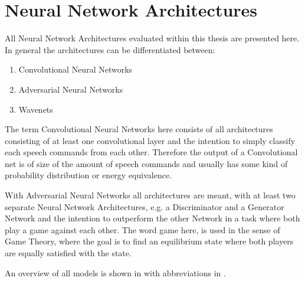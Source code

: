 
\section{Neural Network Architectures}\label{sec:nn_arch}
All Neural Network Architectures evaluated within this thesis are presented here.
In general the architectures can be differentiated between:
\begin{enumerate}
	\item Convolutional Neural Networks
	\item Adversarial Neural Networks
	\item Wavenets
\end{enumerate}
The term Convolutional Neural Networks here consists of all architectures consisting of at least one convolutional layer and the intention to simply classify each speech commands from each other. 
Therefore the output of a Convolutional net is of size of the amount of speech commands and usually has some kind of probability distribution or energy equivalence.

With Adversarial Neural Networks all architectures are meant, with at least two separate Neural Network Architectures, e.g. a Discriminator and a Generator Network and the intention to outperform the other Network in a task where both play a game against each other.
The word game here, is used in the sense of Game Theory, where the goal is to find an equilibrium state where both players are equally satisfied with the state.

An overview of all models is shown in  with abbreviations in .

